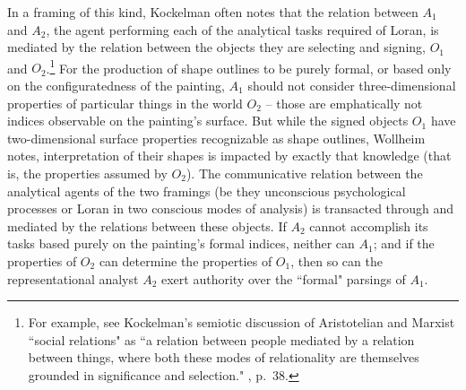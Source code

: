 In a framing of this kind, Kockelman often notes that the relation between $A_1$ and $A_2$, the agent performing each of the analytical tasks required of Loran, is mediated by the relation between the objects they are selecting and signing, $O_1$ and $O_2$.\footnote{For example, see Kockelman's semiotic discussion of Aristotelian and Marxist ``social relations" as ``a relation between people mediated by a relation between things, where both these modes of relationality are themselves grounded in significance and selection."  \cite{kockelman2013}, p.\ 38.}  For the production of shape outlines to be purely formal, or based only on the configuratedness of the painting, $A_1$ should not consider three-dimensional properties of particular things in the world $O_2$ -- those are emphatically not indices observable on the painting's surface.  But while the signed objects $O_1$ have two-dimensional surface properties recognizable as shape outlines, Wollheim notes, interpretation of their shapes is impacted by exactly that knowledge (that is, the properties assumed by $O_2$).  The communicative relation between the analytical agents of the two framings (be they unconscious psychological processes or Loran in two conscious modes of analysis) is transacted through and mediated by the relations between these objects.  If $A_2$ cannot accomplish its tasks based purely on the painting's formal indices, neither can $A_1$; and if the properties of $O_2$ can determine the properties of $O_1$, then so can the representational analyst $A_2$ exert authority over the ``formal" parsings of $A_1$.

